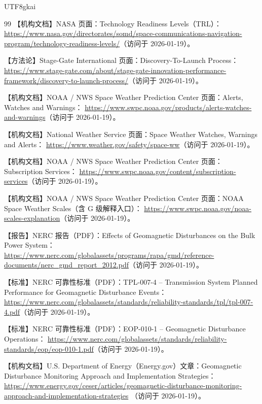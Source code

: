 \documentclass[12pt]{article}
\begin{document}
\begin{CJK*}{UTF8}{gkai}
\begin{thebibliography}{99}
【机构文档】NASA 页面：Technology Readiness Levels（TRL）：
\url{https://www.nasa.gov/directorates/somd/space-communications-navigation-program/technology-readiness-levels/}（访问于
  2026-01-19）。

【方法论】Stage-Gate International 页面：Discovery-To-Launch Process：
\url{https://www.stage-gate.com/about/stage-gate-innovation-performance-framework/discovery-to-launch-process/}（访问于
  2026-01-19）。

【机构文档】NOAA / NWS Space Weather Prediction Center 页面：Alerts, Watches and Warnings：
\url{https://www.swpc.noaa.gov/products/alerts-watches-and-warnings}（访问于 2026-01-19）。

【机构文档】National Weather Service 页面：Space Weather Watches, Warnings and Alerts：
\url{https://www.weather.gov/safety/space-ww}（访问于 2026-01-19）。

【机构文档】NOAA / NWS Space Weather Prediction Center 页面：Subscription Services：
\url{https://www.swpc.noaa.gov/content/subscription-services}（访问于 2026-01-19）。

【机构文档】NOAA / NWS Space Weather Prediction Center 页面：NOAA Space Weather Scales（含 G 级解释入口）：
\url{https://www.swpc.noaa.gov/noaa-scales-explanation}（访问于 2026-01-19）。

【报告】NERC 报告（PDF）：Effects of Geomagnetic Disturbances on the Bulk Power System：
\url{https://www.nerc.com/globalassets/programs/rapa/gmd/reference-documents/nerc_gmd_report_2012.pdf}（访问于 2026-01-19）。

【标准】NERC 可靠性标准（PDF）：TPL-007-4 -- Transmission System Planned Performance for Geomagnetic Disturbance Events：
\url{https://www.nerc.com/globalassets/standards/reliability-standards/tpl/tpl-007-4.pdf}（访问于 2026-01-19）。

【标准】NERC 可靠性标准（PDF）：EOP-010-1 -- Geomagnetic Disturbance Operations：
\url{https://www.nerc.com/globalassets/standards/reliability-standards/eop/eop-010-1.pdf}（访问于 2026-01-19）。

【机构文档】U.S. Department of Energy（Energy.gov）文章：Geomagnetic Disturbance Monitoring Approach and Implementation Strategies：
\url{https://www.energy.gov/ceser/articles/geomagnetic-disturbance-monitoring-approach-and-implementation-strategies}
  （访问于 2026-01-19）。


\end{thebibliography}
\end{CJK*}
\end{document}
